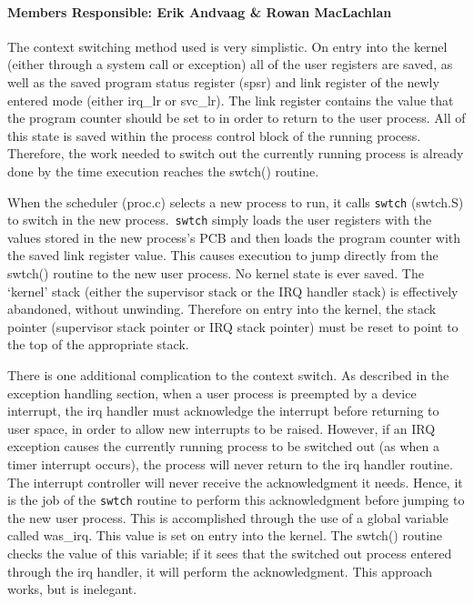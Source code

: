 \documentclass[12pt]{article}
\newcommand{\code}[1]{\colorbox{codegray}{\texttt{\footnotesize{#1}}}}
\begin{document}
\paragraph{Members Responsible: Erik Andvaag \& Rowan MacLachlan}

The context switching method used is very simplistic. On entry into the
kernel (either through a system call or exception) all of the user
registers are saved, as well as the saved program status register
(spsr) and link register of the newly entered mode (either irq\_lr or
svc\_lr). The link register contains the value that the program counter
should be set to in order to return to the user process. All of this
state is saved within the process control block of the running process.
Therefore, the work needed to switch out the currently running process
is already done by the time execution reaches the swtch() routine.

When the scheduler (proc.c) selects a new process to run, it calls
\code{swtch} (swtch.S) to switch in the new process.\ \code{swtch} simply loads
the user registers with the values stored in the new process's PCB and
then loads the program counter with the saved link register value. This
causes execution to jump directly from the swtch() routine to the new
user process. No kernel state is ever saved. The `kernel' stack (either
the supervisor stack or the IRQ handler stack) is effectively
abandoned, without unwinding. Therefore on entry into the kernel, the
stack pointer (supervisor stack pointer or IRQ stack pointer) must be
reset to point to the top of the appropriate stack.

There is one additional complication to the context switch. As
described in the exception handling section, when a user process is
preempted by a device interrupt, the irq handler must acknowledge the
interrupt before returning to user space, in order to allow new
interrupts to be raised. However, if an IRQ exception causes the
currently running process to be switched out (as when a timer interrupt
occurs), the process will never return to the irq handler routine. The
interrupt controller will never receive the acknowledgment it needs.
Hence, it is the job of the \code{swtch} routine to perform this
acknowledgment before jumping to the new user process. This is
accomplished through the use of a global variable called was\_irq.
This value is set on entry into the kernel. The swtch() routine checks
the value of this variable; if it sees that the switched out process
entered through the irq handler, it will perform the acknowledgment.
This approach works, but is inelegant.
\end{document}
